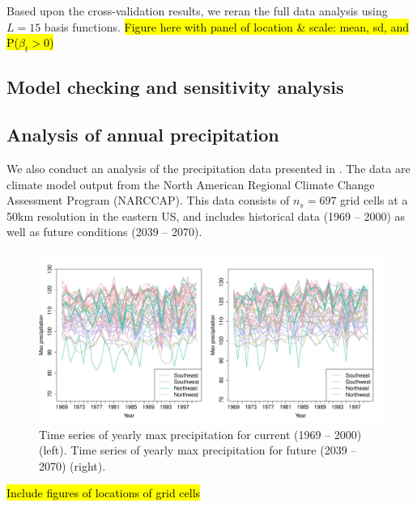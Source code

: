 \documentclass[11pt]{article}
\begin{document}

Based upon the cross-validation results, we reran the full data analysis using $L = 15$ basis functions.
\hl{Figure here with panel of location \& scale: mean, sd, and P($\beta_t > 0$)}


\subsection{Model checking and sensitivity analysis}

\subsection{Analysis of annual precipitation}\label{ebs:precip}
We also conduct an analysis of the precipitation data presented in \citep{Reich2012}.
The data are climate model output from the North American Regional Climate Change Assessment Program (NARCCAP).
This data consists of $n_s = 697$ grid cells at a 50km resolution in the eastern US, and includes historical data (1969 -- 2000) as well as future conditions (2039 -- 2070).

\begin{figure}  %
  \centering
  \includegraphics[width=\linewidth]{plots/precip-ts}
  \caption{Time series of yearly max precipitation for current (1969 -- 2000) (left). Time series of yearly max precipitation for future (2039 -- 2070) (right).}
  \label{ebf:tsprecip}
\end{figure}

\hl{Include figures of locations of grid cells}
\end{document}
